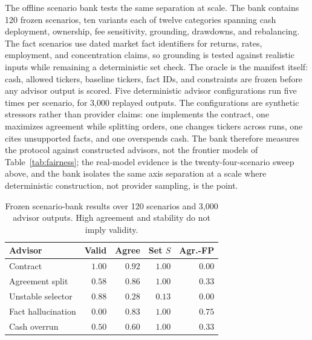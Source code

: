 \documentclass[sigconf,review,anonymous]{acmart}
\begin{document}
The offline scenario bank tests the same separation at scale. The bank contains 120 frozen scenarios, ten variants each of twelve categories spanning cash deployment, ownership, fee sensitivity, grounding, drawdowns, and rebalancing. The fact scenarios use dated market fact identifiers for returns, rates, employment, and concentration claims, so grounding is tested against realistic inputs while remaining a deterministic set check. The oracle is the manifest itself: cash, allowed tickers, baseline tickers, fact IDs, and constraints are frozen before any advisor output is scored. Five deterministic advisor configurations run five times per scenario, for 3,000 replayed outputs. The configurations are synthetic stressors rather than provider claims: one implements the contract, one maximizes agreement while splitting orders, one changes tickers across runs, one cites unsupported facts, and one overspends cash. The bank therefore measures the protocol against constructed advisors, not the frontier models of Table~\ref{tab:fairness}; the real-model evidence is the twenty-four-scenario sweep above, and the bank isolates the same axis separation at a scale where deterministic construction, not provider sampling, is the point.

\begin{table}[tb]
\caption{Frozen scenario-bank results over 120 scenarios and 3,000 advisor outputs. High agreement and stability do not imply validity.}
  \label{tab:scenario-bank}
\begin{tabular}{lrrrr}
\toprule
Advisor & Valid & Agree & Set $S$ & Agr.-FP \\
\midrule
Contract & $1.00$ & $0.92$ & $1.00$ & $0.00$ \\
Agreement split & $0.58$ & $0.86$ & $1.00$ & $0.33$ \\
Unstable selector & $0.88$ & $0.28$ & $0.13$ & $0.00$ \\
Fact hallucination & $0.00$ & $0.83$ & $1.00$ & $0.75$ \\
Cash overrun & $0.50$ & $0.60$ & $1.00$ & $0.33$ \\
\bottomrule
  \end{tabular}
\end{table}
\end{document}
